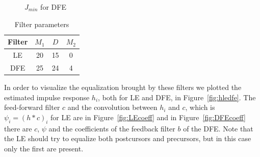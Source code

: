 \documentclass[10pt]{article}
\begin{document}
\begin{figure}
	\centering
	\caption{$J_{min}$ for DFE}
	\label{fig:jmindfe}
\end{figure}

\begin{table}[h!]
	\centering
	\begin{tabular}{c|c|c|c}
	Filter 	& 	$M_1$	& 	$D$		&		$M_2$		\\ \hline
	LE 		&	20		&	15		&		0			\\
	DFE 	&	25		&	24		&		4			\\
	\end{tabular}
	\caption{Filter parameters}
	\label{table:ledfe}
\end{table}

In order to visualize the equalization brought by these filters we plotted the estimated impulse response $h_i$, both for LE and DFE, in Figure~\ref{fig:hledfe}. The feed-forward filter $c$ and the convolution between $h_i$ and $c$, which is $\psi_i = (h*c)_i$ for LE are in Figure~\ref{fig:LEcoeff} and in Figure~\ref{fig:DFEcoeff} there are $c$, $\psi$ and the coefficients of the feedback filter $b$ of the DFE. Note that the LE should try to equalize both postcursors and precursors, but in this case only the first are present. 
\end{document}
